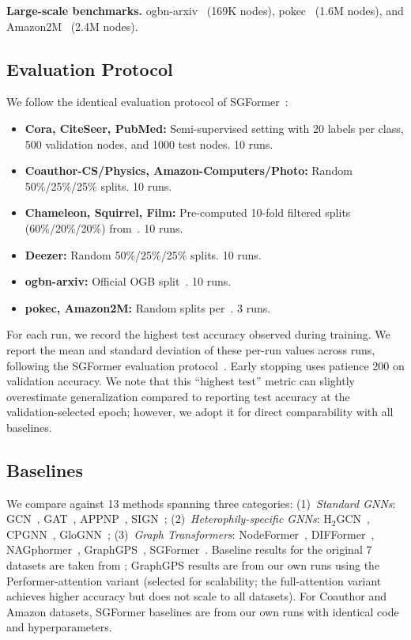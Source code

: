 \documentclass[manuscript, screen, review, anonymous]{acmart}
\begin{document}
\noindent\textbf{Large-scale benchmarks.} ogbn-arxiv~\cite{hu2020ogb} (169K nodes), pokec~\cite{lim2021large} (1.6M nodes), and Amazon2M~\cite{wu2022nodeformer} (2.4M nodes).

\subsection{Evaluation Protocol}

We follow the identical evaluation protocol of SGFormer~\cite{wu2023sgformer}:

\begin{itemize}
    \item \textbf{Cora, CiteSeer, PubMed:} Semi-supervised setting with 20 labels per class, 500 validation nodes, and 1000 test nodes. 10 runs.
    \item \textbf{Coauthor-CS/Physics, Amazon-Computers/Photo:} Random 50\%/25\%/25\% splits. 10 runs.
    \item \textbf{Chameleon, Squirrel, Film:} Pre-computed 10-fold filtered splits (60\%/20\%/20\%) from~\citet{platonov2023critical}. 10 runs.
    \item \textbf{Deezer:} Random 50\%/25\%/25\% splits. 10 runs.
    \item \textbf{ogbn-arxiv:} Official OGB split~\cite{hu2020ogb}. 10 runs.
    \item \textbf{pokec, Amazon2M:} Random splits per~\citet{lim2021large, wu2022nodeformer}. 3 runs.
\end{itemize}

For each run, we record the highest test accuracy observed during training. We report the mean and standard deviation of these per-run values across runs, following the SGFormer evaluation protocol~\cite{wu2023sgformer}. Early stopping uses patience 200 on validation accuracy. We note that this ``highest test'' metric can slightly overestimate generalization compared to reporting test accuracy at the validation-selected epoch; however, we adopt it for direct comparability with all baselines.

\subsection{Baselines}

We compare against 13 methods spanning three categories: (1)~\emph{Standard GNNs}: GCN~\cite{kipf2017semi}, GAT~\cite{velickovic2018gat}, APPNP~\cite{klicpera2019appnp}, SIGN~\cite{rossi2020sign}; (2)~\emph{Heterophily-specific GNNs}: H$_2$GCN~\cite{zhu2020h2gcn}, CPGNN~\cite{zhu2021cpgnn}, GloGNN~\cite{li2022glognn}; (3)~\emph{Graph Transformers}: NodeFormer~\cite{wu2022nodeformer}, DIFFormer~\cite{wu2023difformer}, NAGphormer~\cite{chen2023nagphormer}, GraphGPS~\cite{rampasek2022graphgps}, SGFormer~\cite{wu2023sgformer}. Baseline results for the original 7 datasets are taken from \citet{wu2023sgformer}; GraphGPS results are from our own runs using the Performer-attention variant (selected for scalability; the full-attention variant achieves higher accuracy but does not scale to all datasets). For Coauthor and Amazon datasets, SGFormer baselines are from our own runs with identical code and hyperparameters.
\end{document}
